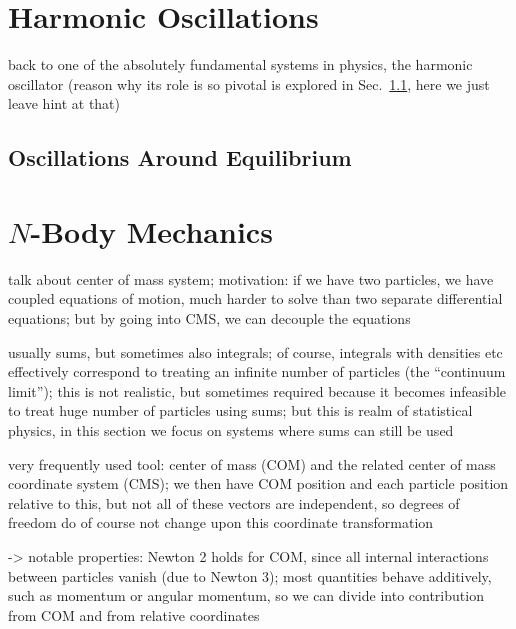 \documentclass[../class_mech_main.tex]{subfiles}
\begin{document}
	\section{Harmonic Oscillations}
back to one of the absolutely fundamental systems in physics, the harmonic oscillator (reason why its role is so pivotal is explored in Sec.~\ref{subsec:osc_around_equ}, here we just leave hint at that)



		\subsection{Oscillations Around Equilibrium}
		\label{subsec:osc_around_equ}



	\section{$N$-Body Mechanics}
talk about center of mass system; motivation: if we have two particles, we have coupled equations of motion, much harder to solve than two separate differential equations; but by going into CMS, we can decouple the equations


usually sums, but sometimes also integrals; of course, integrals with densities etc effectively correspond to treating an infinite number of particles (the \enquote{continuum limit});
this is not realistic, but sometimes required because it becomes infeasible to treat huge number of particles using sums; but this is realm of statistical physics, in this section we focus on systems where sums can still be used



very frequently used tool: center of mass (COM) and the related center of mass coordinate system (CMS); we then have COM position and each particle position relative to this, but not all of these vectors are independent, so degrees of freedom do of course not change upon this coordinate transformation


-> notable properties: Newton 2 holds for COM, since all internal interactions between particles vanish (due to Newton 3); most quantities behave additively, such as momentum or angular momentum, so we can divide into contribution from COM and from relative coordinates
\end{document}
